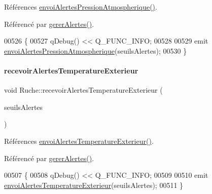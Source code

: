 Références \hyperlink{class_ruche_a97ae09a121944f7df48fb38bd049b878}{envoi\+Alertes\+Pression\+Atmospherique()}.



Référencé par \hyperlink{class_ruche_a80f3538f081aea887d7199f114dfca01}{gerer\+Alertes()}.


\begin{DoxyCode}
00526 \{
00527     qDebug() << Q\_FUNC\_INFO;
00528 
00529     emit \hyperlink{class_ruche_a97ae09a121944f7df48fb38bd049b878}{envoiAlertesPressionAtmospherique}(seuilsAlertes);
00530 \}
\end{DoxyCode}
\mbox{\label{class_ruche_af09b04e9a415ad3df9941068b74046fc}} 
\paragraph{\texorpdfstring{recevoir\+Alertes\+Temperature\+Exterieur}{recevoirAlertesTemperatureExterieur}}
{\footnotesize\ttfamily void Ruche\+::recevoir\+Alertes\+Temperature\+Exterieur (\begin{DoxyParamCaption}\item[{\hyperlink{parametres_8h_aaa6de8207c94675264c90b10b613368d}{Seuils\+Alertes}}]{seuils\+Alertes }\end{DoxyParamCaption})\hspace{0.3cm}{\ttfamily [slot]}}



Références \hyperlink{class_ruche_a5bb36a4bb9692a744a1b7ebc5fc59f57}{envoi\+Alertes\+Temperature\+Exterieur()}.



Référencé par \hyperlink{class_ruche_a80f3538f081aea887d7199f114dfca01}{gerer\+Alertes()}.


\begin{DoxyCode}
00507 \{
00508     qDebug() << Q\_FUNC\_INFO;
00509 
00510     emit \hyperlink{class_ruche_a5bb36a4bb9692a744a1b7ebc5fc59f57}{envoiAlertesTemperatureExterieur}(seuilsAlertes);
00511 \}
\end{DoxyCode}
\mbox{\label{class_ruche_a2984c1e492d1ceacd3081e39a4f8cc26}} 
